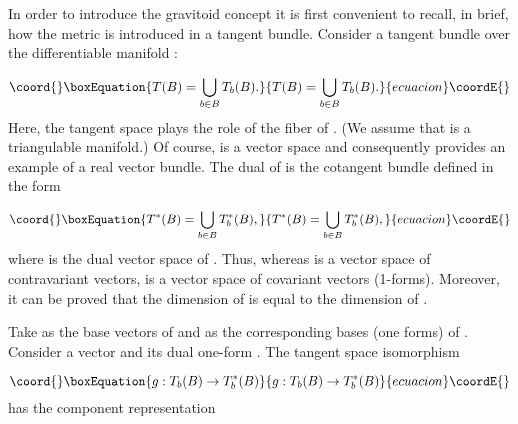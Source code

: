 \documentclass[a4paper,12pt]{article}
\begin{document}
In order to introduce the gravitoid concept it is first convenient to
recall, in brief, how the metric is introduced in a tangent bundle. Consider
a tangent bundle over the differentiable manifold \coordHE{}:

\begin{equation}\coord{}\boxEquation{
T(B)=\bigcup_{b\in B}T_{b}(B).  \label{23}
}{
T(B)=\bigcup_{b\in B}T_{b}(B).  }{ecuacion}\coordE{}\end{equation}
Here, the tangent space \coordHE{} plays the role of the fiber of \coordHE{}.
(We assume that \coordHE{} is a triangulable manifold.) Of course, \coordHE{} is a
vector space and consequently \coordHE{} provides an example of a real vector
bundle. The dual of \coordHE{} is the cotangent bundle \coordHE{} defined in
the form

\begin{equation}\coord{}\boxEquation{
T^{\ast }(B)=\bigcup_{b\in B}T_{b}^{\ast }(B),  \label{24}
}{
T^{\ast }(B)=\bigcup_{b\in B}T_{b}^{\ast }(B),  }{ecuacion}\coordE{}\end{equation}
where \coordHE{} is the dual vector space of \coordHE{}. Thus,
whereas \coordHE{} is a vector space of contravariant vectors, \coordHE{} is a vector space of covariant vectors (1-forms). Moreover, it can be
proved that the dimension of \coordHE{} is equal to the dimension of 
\coordHE{}.

Take \coordHE{}  \coordHE{} as the base
vectors of \coordHE{} and \coordHE{} as the corresponding bases (one forms)
of \coordHE{}. Consider a vector \coordHE{} and its dual one-form \coordHE{}. The tangent space
isomorphism

\begin{equation}\coord{}\boxEquation{
g:T_{b}(B)\rightarrow T_{b}^{\ast }(B)  \label{25}
}{
g:T_{b}(B)\rightarrow T_{b}^{\ast }(B)  }{ecuacion}\coordE{}\end{equation}
has the component representation
\end{document}
